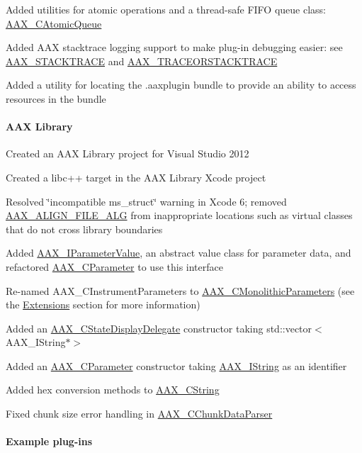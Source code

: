 \begin{DoxyItemize}
\item Added utilities for atomic operations and a thread-\/safe F\+I\+F\+O queue class\+: \hyperlink{a00010}{A\+A\+X\+\_\+\+C\+Atomic\+Queue} 
\item Added A\+A\+X stacktrace logging support to make plug-\/in debugging easier\+: see \hyperlink{a00158_ae871829dd7297e4a5ae6c7094f6b5398}{A\+A\+X\+\_\+\+S\+T\+A\+C\+K\+T\+R\+A\+C\+E} and \hyperlink{a00158_a96862f9cb28b6a49eb5dbd6da9975ed1}{A\+A\+X\+\_\+\+T\+R\+A\+C\+E\+O\+R\+S\+T\+A\+C\+K\+T\+R\+A\+C\+E} 
\item Added a utility for locating the .aaxplugin bundle to provide an ability to access resources in the bundle 
\end{DoxyItemize}\hypertarget{a00375_aax_sdk_2p2p0_AAX_Library}{}\paragraph{A\+A\+X Library}\label{a00375_aax_sdk_2p2p0_AAX_Library}

\begin{DoxyItemize}
\item Created an A\+A\+X Library project for Visual Studio 2012 
\item Created a libc++ target in the A\+A\+X Library Xcode project 
\item Resolved \char`\"{}incompatible ms\+\_\+struct\char`\"{} warning in Xcode 6; removed \hyperlink{a00149_a8fbeac3c5db5ac694e85a021ed74dc9e}{A\+A\+X\+\_\+\+A\+L\+I\+G\+N\+\_\+\+F\+I\+L\+E\+\_\+\+A\+L\+G} from inappropriate locations such as virtual classes that do not cross library boundaries 
\item Added \hyperlink{a00109}{A\+A\+X\+\_\+\+I\+Parameter\+Value}, an abstract value class for parameter data, and refactored \hyperlink{a00033}{A\+A\+X\+\_\+\+C\+Parameter} to use this interface 
\item Re-\/named {\ttfamily A\+A\+X\+\_\+\+C\+Instrument\+Parameters} to \hyperlink{a00026}{A\+A\+X\+\_\+\+C\+Monolithic\+Parameters} (see the \hyperlink{a00375_aax_sdk_2p0p0_Extensions}{Extensions} section for more information) 
\item Added an \hyperlink{a00039}{A\+A\+X\+\_\+\+C\+State\+Display\+Delegate} constructor taking {\ttfamily std\+::vector$<$\+A\+A\+X\+\_\+\+I\+String$\ast$$>$} 
\item Added an \hyperlink{a00033}{A\+A\+X\+\_\+\+C\+Parameter} constructor taking \hyperlink{a00113}{A\+A\+X\+\_\+\+I\+String} as an identifier 
\item Added hex conversion methods to \hyperlink{a00042}{A\+A\+X\+\_\+\+C\+String} 
\item Fixed chunk size error handling in \hyperlink{a00014}{A\+A\+X\+\_\+\+C\+Chunk\+Data\+Parser} 
\end{DoxyItemize}\hypertarget{a00375_aax_sdk_2p2p0_Example_plugins}{}\paragraph{Example plug-\/ins}\label{a00375_aax_sdk_2p2p0_Example_plugins}

